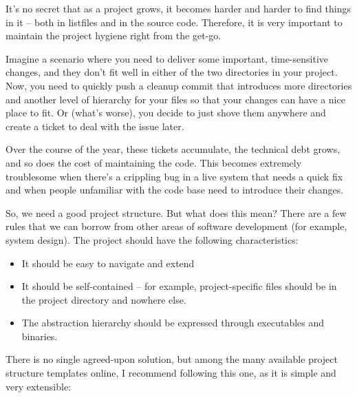 It's no secret that as a project grows, it becomes harder and harder to find things in it – both in listfiles and in the source code. Therefore, it is very important to maintain the project hygiene right from the get-go.

Imagine a scenario where you need to deliver some important, time-sensitive changes, and they don't fit well in either of the two directories in your project. Now, you need to quickly push a cleanup commit that introduces more directories and another level of hierarchy for your files so that your changes can have a nice place to fit. Or (what's worse), you decide to just shove them anywhere and create a ticket to deal with the issue later.

Over the course of the year, these tickets accumulate, the technical debt grows, and so does the cost of maintaining the code. This becomes extremely troublesome when there's a crippling bug in a live system that needs a quick fix and when people unfamiliar with the code base need to introduce their changes.

So, we need a good project structure. But what does this mean? There are a few rules that we can borrow from other areas of software development (for example, system design).
The project should have the following characteristics:

\begin{itemize}
\item 
It should be easy to navigate and extend

\item 
It should be self-contained – for example, project-specific files should be in the project directory and nowhere else.

\item 
The abstraction hierarchy should be expressed through executables and binaries.
\end{itemize}

There is no single agreed-upon solution, but among the many available project structure templates online, I recommend following this one, as it is simple and very extensible:


